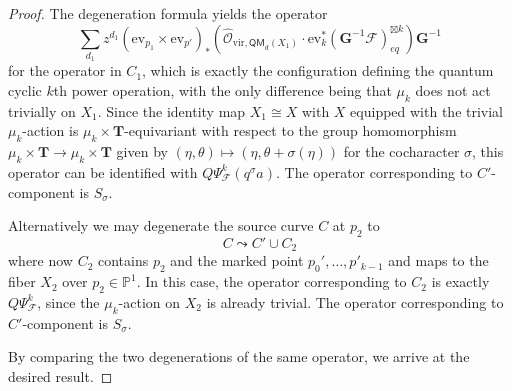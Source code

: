 \documentclass[10pt,a4paper]{amsart}
\newcommand{\curly}{\mathrel{\leadsto}}
\begin{document}
\begin{proof}
    The degeneration formula yields the operator
    \begin{equation}
       \sum_{d_1} z^{d_1} (\mathrm{ev}_{p_1} \times \mathrm{ev}_{p'} )_*  \left(  \hat{\mathcal{O}}_{\mathrm{vir} ,\mathsf{QM}_d (X_1)} \cdot   \mathrm{ev}_k^* (\mathbf{G}^{-1}\mathcal{F})_{eq}^{\boxtimes k} \right) \mathbf{G}^{-1}
    \end{equation}
    for the operator in $C_1$, which is exactly the configuration defining the quantum cyclic $k$th power operation, with the only difference being that $\mu_k$ does not act trivially on $X_1$. Since the identity map $X_1 \cong X$ with $X$ equipped with the trivial $\mu_k$-action is $\mu_k \times \mathbf{T}$-equivariant with respect to the group homomorphism $\mu_k \times \mathbf{T} \to \mu_k \times \mathbf{T}$ given by $(\eta, \theta) \mapsto (\eta, \theta + \sigma(\eta))$ for the cocharacter $\sigma$, this operator can be identified with $Q\Psi^k_\mathcal{F} (q^\sigma a)$.  The operator corresponding to $C'$-component is $S_\sigma$.

    Alternatively we may degenerate the source curve $C$ at $p_2$ to
    \begin{equation}
        C \curly C' \cup C_2
    \end{equation}
    where now $C_2$ contains $p_2$ and the marked point $p_0' , \dots, p'_{k-1}$ and maps to the fiber $X_2$ over $p_2 \in \mathbb{P}^1$. In this case, the operator corresponding to $C_2$ is exactly $Q\Psi^k_\mathcal{F}$, since the $\mu_k$-action on $X_2$ is already trivial. The operator corresponding to $C'$-component is $S_\sigma$.

    By comparing the two degenerations of the same operator, we arrive at the desired result.
    
    
\end{proof}
\end{document}
